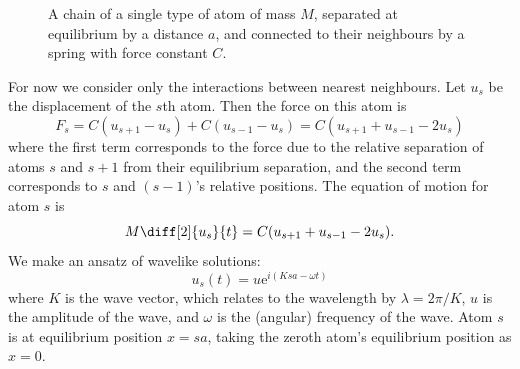 \documentclass[fleqn]{NotesClass}
\newcommand*{\e}{\mathrm{e}}
\begin{document}
    \begin{figure}
        \caption[One-dimensional chain of atoms.]{A chain of a single type of atom of mass \(M\), separated at equilibrium by a distance \(a\), and connected to their neighbours by a spring with force constant \(C\).}
    \end{figure}
    
    For now we consider only the interactions between nearest neighbours.
    Let \(u_s\) be the displacement of the \(s\)th atom.
    Then the force on this atom is
    \begin{equation}
        F_s = C(u_{s+1} - u_s) + C(u_{s-1} - u_s) = C(u_{s+1} + u_{s-1} - 2u_s)
    \end{equation}
    where the first term corresponds to the force due to the relative separation of atoms \(s\) and \(s + 1\) from their equilibrium separation, and the second term corresponds to \(s\) and \((s - 1)\)'s relative positions.
    The equation of motion for atom \(s\) is
    \begin{equation}\label{eqn:1d phonon eom}
        M\diff[2]{u_s}{t} = C(u_{s+1} + u_{s-1} - 2u_s).
    \end{equation}
    We make an ansatz of wavelike solutions:
    \begin{equation}
        u_s(t) = u\e^{i(Ksa - \omega t)}
    \end{equation}
    where \(K\) is the wave vector, which relates to the wavelength by \(\lambda = 2\pi/K\), \(u\) is the amplitude of the wave, and \(\omega\) is the (angular) frequency of the wave.
    Atom \(s\) is at equilibrium position \(x = sa\), taking the zeroth atom's equilibrium position as \(x = 0\).
    
\end{document}

